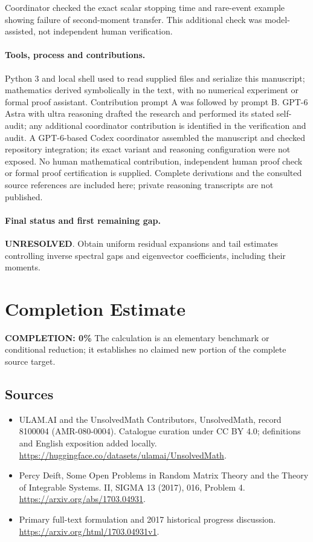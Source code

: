 \documentclass[11pt]{article}
\begin{document}
Coordinator checked the exact scalar stopping time and rare-event example showing failure of second-moment transfer. This additional check was model-assisted, not independent human verification.

\paragraph{Tools, process and contributions.}
Python 3 and local shell used to read supplied files and serialize this manuscript; mathematics derived symbolically in the text, with no numerical experiment or formal proof assistant. Contribution prompt A was followed by prompt B. GPT-6 Astra with ultra reasoning drafted the research and performed its stated self-audit; any additional coordinator contribution is identified in the verification and audit. A GPT-6-based Codex coordinator assembled the manuscript and checked repository integration; its exact variant and reasoning configuration were not exposed. No human mathematical contribution, independent human proof check or formal proof certification is supplied. Complete derivations and the consulted source references are included here; private reasoning transcripts are not published.

\paragraph{Final status and first remaining gap.}
\textbf{UNRESOLVED}. Obtain uniform residual expansions and tail estimates controlling inverse spectral gaps and eigenvector coefficients, including their moments.

\section{Completion Estimate}
\noindent\textbf{COMPLETION: 0\%}
The calculation is an elementary benchmark or conditional reduction; it establishes no claimed new portion of the complete source target.

\subsection{Sources}
\begin{itemize}
\item[\hypertarget{source:8100004:1}{S1}] ULAM.AI and the UnsolvedMath Contributors, UnsolvedMath, record 8100004 (AMR-080-0004). Catalogue curation under CC BY 4.0; definitions and English exposition added locally.
\url{https://huggingface.co/datasets/ulamai/UnsolvedMath}.
\item[\hypertarget{source:8100004:2}{S2}] Percy Deift, Some Open Problems in Random Matrix Theory and the Theory of Integrable Systems. II, SIGMA 13 (2017), 016, Problem 4.
\url{https://arxiv.org/abs/1703.04931}.
\item[\hypertarget{source:8100004:3}{S3}] Primary full-text formulation and 2017 historical progress discussion.
\url{https://arxiv.org/html/1703.04931v1}.
\end{itemize}
\label{end:8100004}
\end{document}
